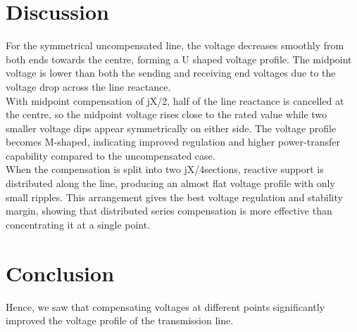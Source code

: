 \documentclass[a4paper,12pt]{report}
\begin{document}
\section{Discussion}
For the symmetrical uncompensated line, the voltage decreases 
smoothly from both ends towards the centre, forming a 
U shaped voltage profile. The midpoint voltage is lower than both the sending and receiving end voltages due to the voltage drop across the line reactance.\\[0.2cm]
With midpoint compensation of jX/2, half of the line reactance is cancelled at the centre, so the midpoint voltage rises close to the rated value while two smaller voltage dips appear symmetrically on either side. The voltage profile becomes M-shaped, indicating improved regulation and higher power-transfer capability compared to the uncompensated case.\\[0.2cm]
When the compensation is split into two jX/4sections, reactive support is distributed along the line, producing an almost flat voltage profile with only small ripples. This arrangement gives the best voltage regulation and stability margin, showing that distributed series compensation is more effective than concentrating it at a single point.
\section{Conclusion}
Hence, we saw that compensating voltages at different points significantly improved the voltage profile of the transmission line.
\end{document}
